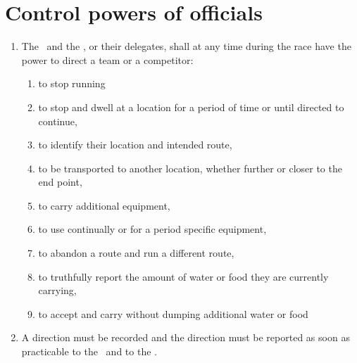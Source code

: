 \documentclass[12pt]{report}
\begin{document}
    \section{Control powers of officials}
  \begin{enumerate}
    \item The \RaceDirector\  and the \Referee, or their delegates, shall at any time during the race have the power to direct a team or a competitor:
    \begin{enumerate}
      \item to stop running
      \item to stop and dwell at a location for a period of time or until directed to continue,
      \item to identify their location and intended route,
      \item to be transported to another location, whether further or closer to the end point,
      \item to carry additional equipment,
      \item to use continually or for a period specific equipment,
      \item to abandon a route and run a different route,
      \item to truthfully report the amount of water or food they are currently carrying,
      \item to accept and carry without dumping additional water or food
    \end{enumerate}
    \item A direction must be recorded and the direction must be reported as soon as practicable to the  \RaceDirector\ and to the \Referee.
  \end{enumerate}
\end{document}
